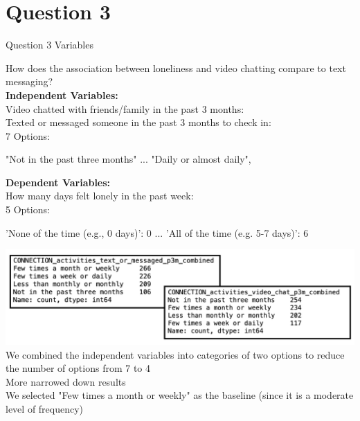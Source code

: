 \documentclass{beamer}
\begin{document}
\section{Question 3}
\begin{frame}{Question 3 Variables}

\small %
How does the association between loneliness and video chatting compare
to text messaging?\\

\vspace{0.5em} %
\textbf{Independent Variables:}\\
\vspace{0.2em}
Video chatted with friends/family in the past 3 months:\\
Texted or messaged someone in the past 3 months to check in:\\

\vspace{0.5em}
7 Options:
\begin{itemize}
    "Not in the past three months" ...
    "Daily or almost daily",
\end{itemize}

\vspace{0.5em}
\textbf{Dependent Variables:}\\
\vspace{0.2em}
How many days felt lonely in the past week:\\

\vspace{0.5em}
5 Options:
\begin{itemize}
    'None of the time (e.g., 0 days)': 0 ... 'All of the time (e.g. 5-7 days)': 6
\end{itemize}

\end{frame}

\begin{frame}
\includegraphics[width=\linewidth]{Screenshot 2024-12-01 at 12.16.24 PM.png}
We combined the independent variables into categories of two options to reduce the number of options from 7 to 4\\
More narrowed down results\\
\vspace{1em}
\small We selected "Few times a month or weekly" as the baseline (since it is a moderate level of frequency)
\end{frame}
\end{document}
